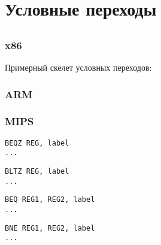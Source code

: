 \chapter{Условные переходы}
\label{sec:Jcc}






\section{\Conclusion{}}

\subsection{x86}

Примерный скелет условных переходов:



\ifdefined\IncludeARM

\subsection{ARM}


\fi

\ifdefined\IncludeMIPS

\subsection{MIPS}

\begin{lstlisting}[caption=Проверка на ноль]
BEQZ REG, label
...
\end{lstlisting}

\begin{lstlisting}[caption=Меньше ли нуля?]
BLTZ REG, label
...
\end{lstlisting}

\begin{lstlisting}[caption=Проверка на равенство]
BEQ REG1, REG2, label
...
\end{lstlisting}

\begin{lstlisting}[caption=Проверка на неравенство]
BNE REG1, REG2, label
...
\end{lstlisting}

